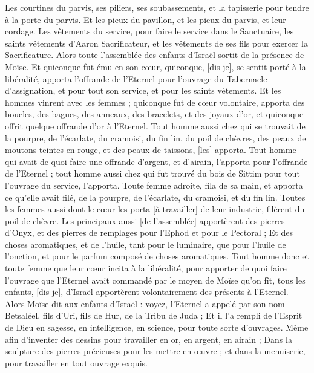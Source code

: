 \begin{multicols}{2}
Les courtines du parvis, ses piliers, ses soubassements, et la tapisserie pour tendre à la porte du parvis.
Et les pieux du pavillon, et les pieux du parvis, et leur cordage.
Les vêtements du service, pour faire le service dans le Sanctuaire, les saints vêtements d'Aaron Sacrificateur, et les vêtements de ses fils pour exercer la Sacrificature.
Alors toute l'assemblée des enfants d'Israël sortit de la présence de Moïse.
Et quiconque fut ému en son cœur, quiconque, [dis-je], se sentit porté à la libéralité, apporta l'offrande de l'Eternel pour l'ouvrage du Tabernacle d'assignation, et pour tout son service, et pour les saints vêtements.
Et les hommes vinrent avec les femmes ; quiconque fut de cœur volontaire, apporta des boucles, des bagues, des anneaux, des bracelets, et des joyaux d'or, et quiconque offrit quelque offrande d'or à l'Eternel.
Tout homme aussi chez qui se trouvait de la pourpre, de l'écarlate, du cramoisi, du fin lin, du poil de chèvres, des peaux de moutons teintes en rouge, et des peaux de taissons, [les] apporta.
Tout homme qui avait de quoi faire une offrande d'argent, et d'airain, l'apporta pour l'offrande de l'Eternel ; tout homme aussi chez qui fut trouvé du bois de Sittim pour tout l'ouvrage du service, l'apporta.
Toute femme adroite, fila de sa main, et apporta ce qu'elle avait filé, de la pourpre, de l'écarlate, du cramoisi, et du fin lin.
Toutes les femmes aussi dont le cœur les porta [à travailler] de leur industrie, filèrent du poil de chèvre.
Les principaux aussi [de l'assemblée] apportèrent des pierres d'Onyx, et des pierres de remplages pour l'Ephod et pour le Pectoral ;
Et des choses aromatiques, et de l'huile, tant pour le luminaire, que pour l'huile de l'onction, et pour le parfum composé de choses aromatiques.
Tout homme donc et toute femme que leur cœur incita à la libéralité, pour apporter de quoi faire l'ouvrage que l'Eternel avait commandé par le moyen de Moïse qu'on fît, tous les enfants, [dis-je], d'Israël apportèrent volontairement des présents à l'Eternel.
Alors Moïse dit aux enfants d'Israël : voyez, l'Eternel a appelé par son nom Betsaléel, fils d'Uri, fils de Hur, de la Tribu de Juda ;
Et il l'a rempli de l'Esprit de Dieu en sagesse, en intelligence, en science, pour toute sorte d'ouvrages.
Même afin d'inventer des dessins pour travailler en or, en argent, en airain ;
Dans la sculpture des pierres précieuses pour les mettre en œuvre ; et dans la menuiserie, pour travailler en tout ouvrage exquis.

\end{multicols}
